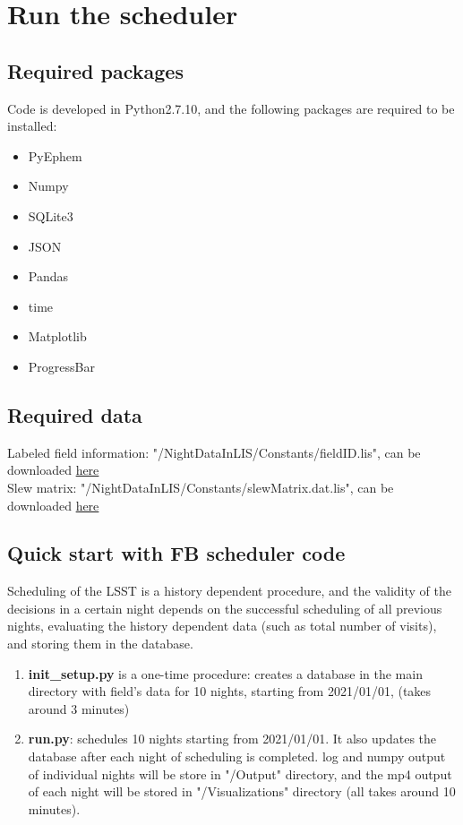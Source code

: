 \documentclass[]{spie}  %
\theoremstyle{definition}
\begin{document}
\newpage
\section{Run the scheduler}
\vspace{1cm}

\subsection{Required packages}
Code is developed in Python2.7.10, and the following packages are required to be installed:

\begin{itemize}
\item PyEphem
\item Numpy
\item SQLite3
\item JSON
\item Pandas
\item time
\item Matplotlib
\item ProgressBar
\end{itemize}


\subsection{Required data}
Labeled field information: "/NightDataInLIS/Constants/fieldID.lis", can be downloaded \href{https://www.dropbox.com/s/0dfuuffx9aoyfix/fieldID.lis?dl=0}{here}\\
Slew matrix: "/NightDataInLIS/Constants/slewMatrix.dat.lis", can be downloaded \href{https://www.dropbox.com/s/6gdyv4pofzb57vz/slewMatrix.dat?dl=0}{here}




\subsection{Quick start with FB scheduler code}

Scheduling of the LSST is a history dependent procedure, and the validity of the decisions in a certain night depends on the successful scheduling of all previous nights, evaluating the history dependent data (such as total number of visits), and storing them in the database.

\begin{enumerate}
\item \textbf{init\_setup.py} is a one-time procedure: creates a database in the main directory with field's data for 10 nights, starting from 2021/01/01, (takes around 3 minutes)
\item \textbf{run.py}: schedules 10 nights starting from 2021/01/01. It also updates the database after each night of scheduling is completed. log and numpy output of individual nights will be store in "/Output" directory, and the mp4 output of each night will be stored in "/Visualizations" directory (all takes around 10 minutes).
\end{enumerate}
\end{document}
